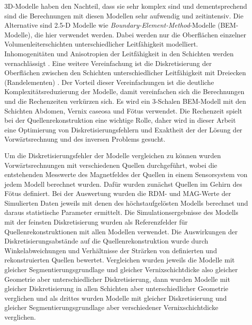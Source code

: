 3D-Modelle haben den Nachteil, dass sie sehr komplex sind und
dementsprechend sind die Berechnungen mit diesen Modellen sehr
aufwendig und zeitintensiv. Die Alternative sind 2.5-D Modelle wie
\textit{Boundary-Element-Method}{}-Modelle (BEM-Modelle), die hier
verwendet werden. Dabei werden nur die Oberflächen einzelner
Volumenleiterschichten unterschiedlicher Leitfähigkeit modelliert.
Inhomogenitäten und Anisotropien der Leitfähigkeit in den Schichten
werden vernachlässigt \cite{a1}. Eine weitere Vereinfachung ist die
Diskretisierung der Oberflächen zwischen den Schichten
unterschiedlicher Leitfähigkeit mit Dreiecken (Randelementen)
\cite{a1}. Der Vorteil dieser Vereinfachungen ist die deutliche
Komplexitätsreduzierung der Modelle, damit vereinfachen sich die
Berechnungen und die Rechenzeiten verkürzen sich. Es wird ein 3-Schalen
BEM-Modell mit den Schichten Abdomen, Vernix caseosa und Fötus
verwendet. Die Rechenzeit spielt bei der Quellenrekonstruktion eine
wichtige Rolle, daher wird in dieser Arbeit eine Optimierung von
Diskretisierungsfehlern und Exaktheit der der Lösung der
Vorwärtsrechnung und des inversen Problems gesucht.

Um die Diskretisierungsfehler der Modelle vergleichen zu können wurden
Vorwärtsrechnungen mit verschiedenen Quellen durchgeführt, wobei die
entstehenden Messwerte des Magnetfeldes der Quellen in einem
Sensorsystem von jedem Modell berechnet wurden. Dafür wurden zunächst
Quellen im Gehirn des Fötus definiert. Bei der Auswertung wurden die
RDM- und MAG-Werte der Simulierten Daten jeweils mit denen des
höchstaufgelösten Modells berechnet und daraus statistische Parameter
ermittelt. Die Simulationsergebnisse des Modells mit der feinsten
Diskretisierung wurden als Referenzfelder für Quellenrekonstruktionen
mit allen Modellen verwendet. Die Auswirkungen der
Diskretisierungsabstände auf die Quellenrekonstruktion wurde durch
Winkelabweichungen und Verhältnisse der Strärken von definierten und
rekonstruierten Quellen bewertet. Vergleichen wurden jeweils die
Modelle mit gleicher Segmentierungsgrundlage und gleicher
Vernixschichtdicke also gleicher Geometrie aber unterschiedlicher
Diskretisierung, dann wurden Modelle mit gleicher Diskretisierung in
allen Schichten aber unterschiedlicher Geometrie verglichen und als
drittes wurden Modelle mit gleicher Diskretisierung und gleicher
Segmentierungsgrundlage aber verschiedener Vernixschichtdicke
verglichen.


